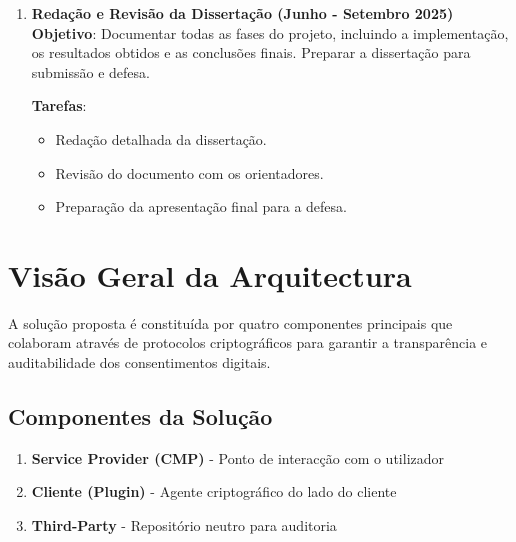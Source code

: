 \begin{enumerate}
    \item \textbf{Redação e Revisão da Dissertação (Junho - Setembro 2025)} \\
    \textbf{Objetivo}: Documentar todas as fases do projeto, incluindo a implementação, os resultados obtidos e as conclusões finais. Preparar a dissertação para submissão e defesa.
    
    \textbf{Tarefas}:
    \begin{itemize}
        \item Redação detalhada da dissertação.
        \item Revisão do documento com os orientadores.
        \item Preparação da apresentação final para a defesa.
    \end{itemize}
\end{enumerate}


\section{Visão Geral da Arquitectura}

A solução proposta é constituída por quatro componentes principais que colaboram através de protocolos criptográficos para garantir a transparência e auditabilidade dos consentimentos digitais.

\subsection{Componentes da Solução}

\begin{enumerate}
    \item \textbf{Service Provider (CMP)} - Ponto de interacção com o utilizador
    \item \textbf{Cliente (Plugin)} - Agente criptográfico do lado do cliente  
    \item \textbf{Third-Party} - Repositório neutro para auditoria
\end{enumerate}

